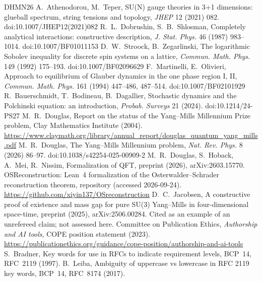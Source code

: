 \documentclass[11pt,a4paper]{article}
\begin{document}
\begin{thebibliography}{DHMN26}
 A.~Athenodorou, M.~Teper, SU(N) gauge theories in 3+1 dimensions: glueball spectrum, string tensions and topology, \emph{JHEP} 12 (2021) 082. doi:10.1007/JHEP12(2021)082
 R.~L.~Dobrushin, S.~B.~Shlosman, Completely analytical interactions: constructive description, \emph{J. Stat. Phys.} 46 (1987) 983--1014. doi:10.1007/BF01011153
 D.~W.~Stroock, B.~Zegarlinski, The logarithmic Sobolev inequality for discrete spin systems on a lattice, \emph{Commun. Math. Phys.} 149 (1992) 175--193. doi:10.1007/BF02096629
 F.~Martinelli, E.~Olivieri, Approach to equilibrium of Glauber dynamics in the one phase region I, II, \emph{Commun. Math. Phys.} 161 (1994) 447--486, 487--514. doi:10.1007/BF02101929
 R.~Bauerschmidt, T.~Bodineau, B.~Dagallier, Stochastic dynamics and the Polchinski equation: an introduction, \emph{Probab. Surveys} 21 (2024). doi:10.1214/24-PS27
 M.~R.~Douglas, Report on the status of the Yang--Mills Millennium Prize problem, Clay Mathematics Institute (2004). \url{https://www.claymath.org/library/annual_report/douglas_quantum_yang_mills.pdf}
 M.~R.~Douglas, The Yang--Mills Millennium problem, \emph{Nat. Rev. Phys.} 8 (2026) 86--97. doi:10.1038/s42254-025-00909-2
 M.~R.~Douglas, S.~Hoback, A.~Mei, R.~Nissim, Formalization of QFT, preprint (2026), arXiv:2603.15770.
 OSReconstruction: Lean~4 formalization of the Osterwalder--Schrader reconstruction theorem, repository (accessed 2026-09-24). \url{https://github.com/xiyin137/OSreconstruction}
 D.~C.~Jacobsen, A constructive proof of existence and mass gap for pure SU(3) Yang--Mills in four-dimensional space-time, preprint (2025), arXiv:2506.00284. Cited as an example of an unrefereed claim; not assessed here.
 Committee on Publication Ethics, \emph{Authorship and AI tools}, COPE position statement (2023). \url{https://publicationethics.org/guidance/cope-position/authorship-and-ai-tools}
 S.~Bradner, Key words for use in RFCs to indicate requirement levels, BCP~14, RFC~2119 (1997).
 B.~Leiba, Ambiguity of uppercase vs lowercase in RFC 2119 key words, BCP~14, RFC~8174 (2017).
\end{thebibliography}
\end{document}
